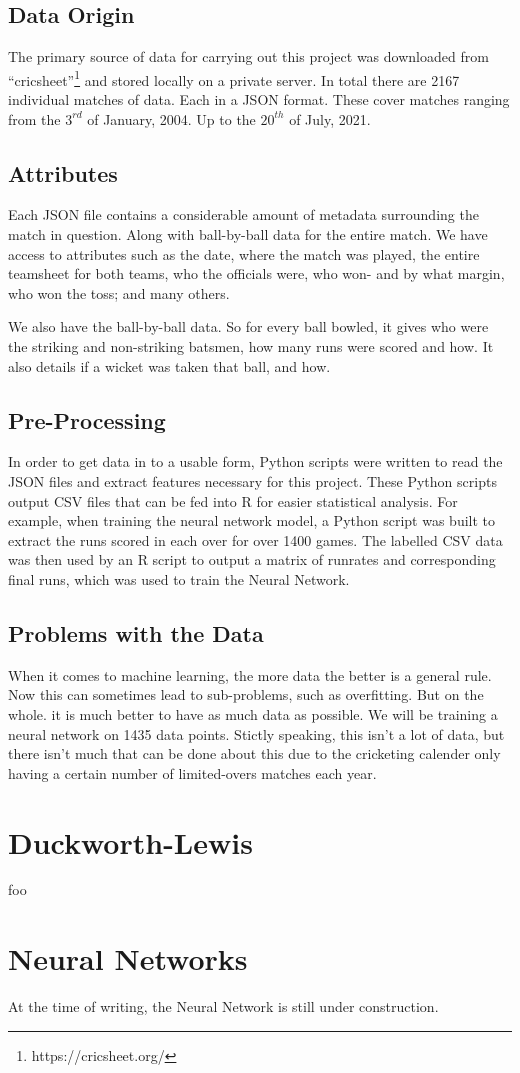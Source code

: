 \documentclass[11pt]{amsart}
\begin{document}
\subsection{Data Origin}
The primary source of data for carrying out this project was downloaded from ``cricsheet''\footnote{https://cricsheet.org/}
and stored locally on a private server. In total there are 2167 individual matches of data. Each in a JSON format.
These cover matches ranging from the $3^{rd}$ of January, 2004. Up to the $20^{th}$ of July, 2021.

\subsection{Attributes}
Each JSON file contains a considerable amount of metadata surrounding the match in question. Along with 
ball-by-ball data for the entire match. We have access to attributes such as the date, where the match was played,
the entire teamsheet for both teams, who the officials were, who won- and by what margin, who won the toss; and many others.

We also have the ball-by-ball data. So for every ball bowled, it gives who were the striking and non-striking batsmen, how many runs
were scored and how. It also details if a wicket was taken that ball, and how.

\subsection{Pre-Processing}
In order to get data in to a usable form, Python scripts were written to read the JSON files and extract features necessary for this project.
These Python scripts output CSV files that can be fed into R for easier statistical analysis. For example, when training the neural network model,
a Python script was built to extract the runs scored in each over for over 1400 games. The labelled CSV data was then used by an R script to 
output a matrix of runrates and corresponding final runs, which was used to train the Neural Network.

\subsection{Problems with the Data}
When it comes to machine learning, the more data the better is a general rule. Now this can sometimes lead to sub-problems, such as overfitting. But on the whole.
it is much better to have as much data as possible. We will be training a neural network on 1435 data points. Stictly speaking, this isn't a lot of data, but there
isn't much that can be done about this due to the cricketing calender only having a certain number of limited-overs matches each year.

\section{Duckworth-Lewis}
foo

\section{Neural Networks}
At the time of writing, the Neural Network is still under construction.

{}

\end{document}
